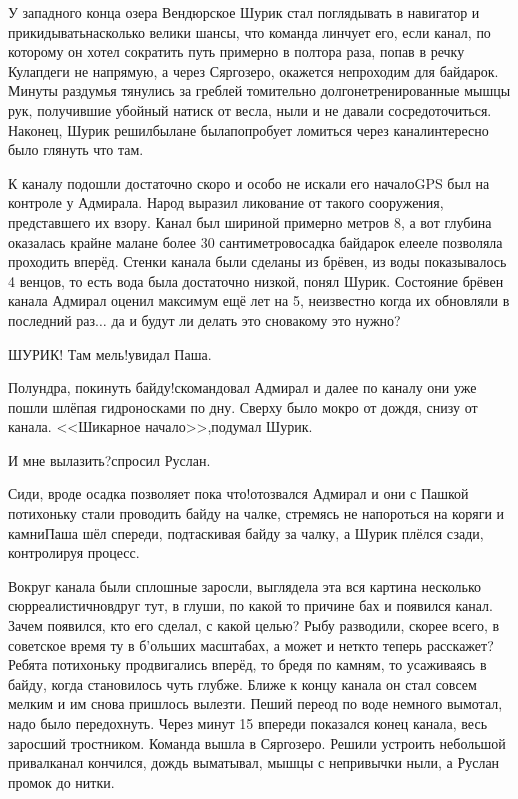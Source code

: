 У западного конца озера Вендюрское Шурик стал поглядывать в навигатор и прикидывать\mdash насколько велики шансы, что команда линчует его, если канал, по которому он хотел сократить путь примерно в полтора раза, попав в речку Кулапдеги не напрямую, а через Сяргозеро, окажется непроходим для байдарок. Минуты раздумья тянулись за греблей томительно долго\mdash нетренированные мышцы рук, получившие убойный натиск от весла, ныли и не давали сосредоточиться. Наконец, Шурик решил\mdash была\sdash не была\mdash попробует ломиться через канал\mdash интересно было глянуть что там.

К каналу подошли достаточно скоро и особо не искали его начало\mdash GPS был на контроле у Адмирала. Народ выразил ликование от такого сооружения, представшего их взору. Канал был шириной примерно метров 8, а вот глубина оказалась крайне мала\mdash не более 30 сантиметров\mdash осадка байдарок еле\sdash еле позволяла проходить вперёд. Стенки канала были сделаны из брёвен, из воды показывалось 4 венцов, то есть вода была достаточно низкой, понял Шурик. Состояние брёвен канала Адмирал оценил максимум ещё лет на 5, неизвестно когда их обновляли в последний раз$\ldots$ да и будут ли делать это снова\mdash кому это нужно?

\diagdash ШУРИК! Там мель!\mdash увидал Паша. 

\diagdash Полундра, покинуть байду!\mdash скомандовал Адмирал и далее по каналу они уже пошли шлёпая гидроносками по дну. Сверху было мокро от дождя, снизу от канала. <<Шикарное начало>>,\mdash подумал Шурик.

\diagdash И мне вылазить?\mdash спросил Руслан. 

\diagdash Сиди, вроде осадка позволяет пока что!\mdash отозвался Адмирал и они с Пашкой потихоньку стали проводить байду на чалке, стремясь не напороться на коряги и камни\mdash Паша шёл спереди, подтаскивая байду за чалку, а Шурик плёлся сзади, контролируя процесс.

Вокруг канала были сплошные заросли, выглядела эта вся картина несколько сюрреалистично\mdash вдруг тут, в глуши, по какой то причине бах и появился канал. Зачем появился, кто его сделал, с какой целью? Рыбу разводили, скорее всего, в советское время ту в б'{о}льших масштабах, а может и нет\mdash кто теперь расскажет? Ребята потихоньку продвигались вперёд, то бредя по камням, то усаживаясь в байду, когда становилось чуть глубже. Ближе к концу канала он стал совсем мелким и им снова пришлось вылезти. Пеший переод по воде немного вымотал, надо было передохнуть. Через минут 15 впереди показался конец канала, весь заросший тростником. Команда вышла в Сяргозеро. Решили устроить небольшой привал\mdash канал кончился, дождь выматывал, мышцы с непривычки ныли, а Руслан промок до нитки.

